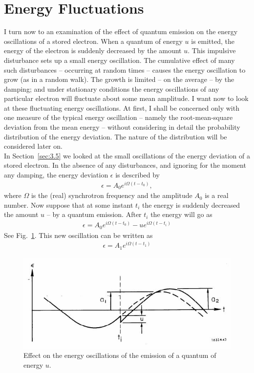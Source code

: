 \section{Energy Fluctuations}\label{sec:5.2}

I turn now to an examination of the effect of quantum emission on the energy oscillations of a stored electron. When a quantum of energy $u$ is emitted, the energy of the electron is suddenly decreased by the amount $u$. This impulsive disturbance sets up a small energy oscillation. The cumulative effect of many such disturbances -- occurring at random times -- causes the energy oscillation to grow (as in a random walk). The growth is limited -- on the average -- by the
damping; and under stationary conditions the energy oscillations of any particular electron will fluctuate about some mean amplitude. I want now to look at these fluctuating energy oscillations.
At first, I shall be concerned only with one measure of the typical energy oscillation -- namely the root-mean-square deviation from the mean energy -- without considering in detail the probability distribution of the energy deviation. The nature of the distribution will be considered
 later on.\\
 In Section~\ref{sec:3.5} we looked at the small oscillations of the energy deviation of a stored electron. In the absence of any disturbances, and ignoring for the moment any damping, the energy deviation $\epsilon$ is described by
\begin{align}
	\epsilon = A_0 e^{i \Omega (t - t_0)},
\end{align}
where $\Omega$ is the (real) synchrotron frequency and the amplitude $A_0$ is a real number. Now suppose that at some instant $t_i$ the energy is suddenly decreased the amount $u$ -- by a quantum emission. After $t_i$ the energy will go as
\begin{align}
	\epsilon = A_0 e^{i \Omega (t - t_0)} - u e^{i \Omega (t - t_i)}
\end{align}
See Fig.~\ref{fig:fig43}. This new oscillation can be written as
\begin{align}
	\epsilon = A_1 e^{i \Omega (t - t_1)}
\end{align}
\begin{figure}[!htb]
	\centering
	\includegraphics[width=0.8\linewidth]{./Figuras/fig43.jpeg}
	\caption{Effect on the energy oscillations of the emission of a quantum of energy $u$.}
	\label{fig:fig43}
\end{figure}
